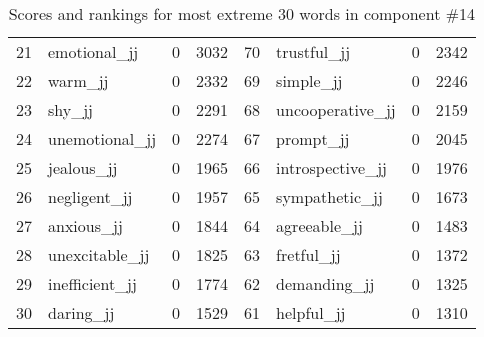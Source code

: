 \begin{table}[tbp]
\begin{tabular}{| rlr@{.}l | rlr@{.}l |}
    21 & emotional\_jj & 0 & 3032    &    70 & trustful\_jj & 0 & 2342 \\
    22 & warm\_jj & 0 & 2332    &    69 & simple\_jj & 0 & 2246 \\
    23 & shy\_jj & 0 & 2291    &    68 & uncooperative\_jj & 0 & 2159 \\
    24 & unemotional\_jj & 0 & 2274    &    67 & prompt\_jj & 0 & 2045 \\
    25 & jealous\_jj & 0 & 1965    &    66 & introspective\_jj & 0 & 1976 \\
    26 & negligent\_jj & 0 & 1957    &    65 & sympathetic\_jj & 0 & 1673 \\
    27 & anxious\_jj & 0 & 1844    &    64 & agreeable\_jj & 0 & 1483 \\
    28 & unexcitable\_jj & 0 & 1825    &    63 & fretful\_jj & 0 & 1372 \\
    29 & inefficient\_jj & 0 & 1774    &    62 & demanding\_jj & 0 & 1325 \\
    30 & daring\_jj & 0 & 1529    &    61 & helpful\_jj & 0 & 1310 \\
    \hline
    \end{tabular}
    \caption{Scores and rankings for most extreme 30 words in component \#14} 
\end{table}
\clearpage
